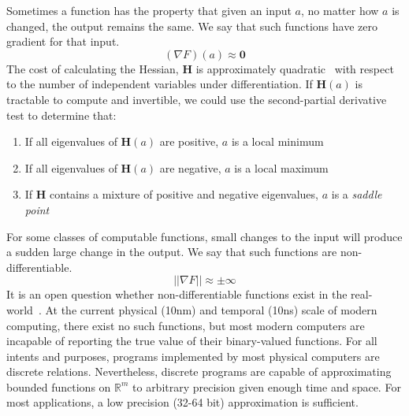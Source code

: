 \documentclass[12pt,initial,twoside,maitrise]{dms}
\numberwithin{equation}{section}
\numberwithin{table}{chapter}
\numberwithin{figure}{chapter}
\begin{document}
\noindent Sometimes a function has the property that given an input $a$, no matter how $a$ is changed, the output remains the same. We say that such functions have zero gradient for that input.
%
\begin{equation}
    (\nabla F)(a) \approx \mathbf{0}
\end{equation}
%
The cost of calculating the Hessian, $\mathbf{H}$ is approximately quadratic~\citep{griewank1993some} with respect to the number of independent variables under differentiation. If $\mathbf{H}(a)$ is tractable to compute and invertible, we could use the second-partial derivative test to determine that:\\
%
\begin{enumerate}
    \item If all eigenvalues of $\mathbf{H}(a)$ are positive, $a$ is a local minimum
    \item If all eigenvalues of $\mathbf{H}(a)$ are negative, $a$ is a local maximum
    \item If $\mathbf{H}$ contains a mixture of positive and negative eigenvalues, $a$ is a \textit{saddle point}\\
\end{enumerate}
%
For some classes of computable functions, small changes to the input will produce a sudden large change in the output. We say that such functions are non-differentiable.
%
\begin{equation}
    ||\nabla F|| \approx \pm \infty
\end{equation}
%
It is an open question whether non-differentiable functions exist in the real-world~\citep{buniy2005hilbert}. At the current physical (10nm) and temporal (10ns) scale of modern computing, there exist no such functions, but most modern computers are incapable of reporting the true value of their binary-valued functions. For all intents and purposes, programs implemented by most physical computers are discrete relations. Nevertheless, discrete programs are capable of approximating bounded functions on $\mathbb{R}^m$ to arbitrary precision given enough time and space. For most applications, a low precision (32-64 bit) approximation is sufficient.
\end{document}

